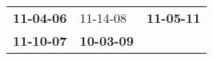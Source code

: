 \begin{supertabular}{p{0.33\columnwidth}p{0.33\columnwidth}p{0.33\columnwidth}}
 \textbf{11-04-06\textsuperscript{}} &           11-14-08\textsuperscript{} &  \textbf{11-05-11\textsuperscript{}} \\
 \textbf{11-10-07\textsuperscript{}} &  \textbf{10-03-09\textsuperscript{}} &                                      \\
\end{supertabular}
